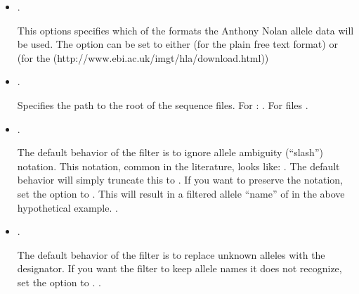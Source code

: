 \documentclass[letterpaper,10pt,english,openany,oneside]{sphinxmanual}
\begin{document}
\begin{itemize}
\item {} 
\sphinxAtStartPar
{}.

\sphinxAtStartPar
This options specifies which of the formats the Anthony Nolan
allele data will be used. The option can be set to either 
(for the plain free text format) or  (for the  (http://www.ebi.ac.uk/imgt/hla/download.html))
\sphinxstylestrong{{[}Default:}  \sphinxstylestrong{{]}}

\item {} 
\sphinxAtStartPar
{}.

\sphinxAtStartPar
Specifies the path to the root of the sequence files. For :
\sphinxstylestrong{{[}Default:}
\sphinxstylestrong{{]}}.  For  files \sphinxstylestrong{{[}Default:}
 \sphinxstylestrong{{]}}.

\item {} 
\sphinxAtStartPar
{}.

\sphinxAtStartPar
The default behavior of the  filter is to ignore
allele ambiguity (“slash”) notation. This notation, common in the
literature, looks like: . The default behavior
will simply truncate this to . If you want to preserve the
notation, set the option to . This will result in a filtered
allele “name” of  in the above hypothetical
example. \sphinxstylestrong{{[}Default:}  \sphinxstylestrong{{]}}.

\item {} 
\sphinxAtStartPar
{}.

\sphinxAtStartPar
The default behavior of the  filter is to replace
unknown alleles with the  designator. If you want
the filter to keep allele names it does not recognize, set the option
to . \sphinxstylestrong{{[}Default:}  \sphinxstylestrong{{]}}.


\end{itemize}
\end{document}

